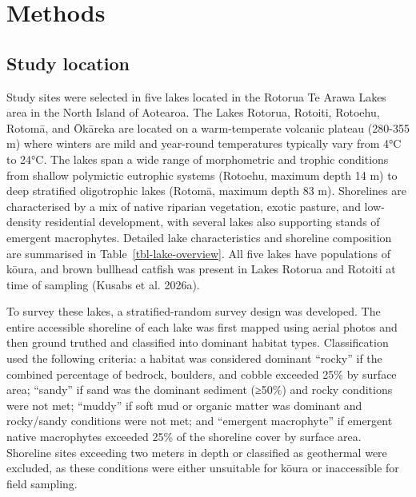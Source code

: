 \documentclass[
  12pt,
  a4paper,
  oneside]{scrbook}
\begin{document}
\section{Methods}\label{methods-1}

\subsection{Study location}\label{study-location}

Study sites were selected in five lakes located in the Rotorua Te Arawa
Lakes area in the North Island of Aotearoa. The Lakes Rotorua, Rotoiti,
Rotoehu, Rotomā, and Ōkāreka are located on a warm-temperate volcanic
plateau (280-355 m) where winters are mild and year-round temperatures
typically vary from 4°C to 24°C. The lakes span a wide range of
morphometric and trophic conditions from shallow polymictic eutrophic
systems (Rotoehu, maximum depth 14 m) to deep stratified oligotrophic
lakes (Rotomā, maximum depth 83 m). Shorelines are characterised by a
mix of native riparian vegetation, exotic pasture, and low-density
residential development, with several lakes also supporting stands of
emergent macrophytes. Detailed lake characteristics and shoreline
composition are summarised in Table~\ref{tbl-lake-overview}. All five
lakes have populations of kōura, and brown bullhead catfish was present
in Lakes Rotorua and Rotoiti at time of sampling (Kusabs et al. 2026a).

To survey these lakes, a stratified-random survey design was developed.
The entire accessible shoreline of each lake was first mapped using
aerial photos and then ground truthed and classified into dominant
habitat types. Classification used the following criteria: a habitat was
considered dominant ``rocky'' if the combined percentage of bedrock,
boulders, and cobble exceeded 25\% by surface area; ``sandy'' if sand
was the dominant sediment (≥50\%) and rocky conditions were not met;
``muddy'' if soft mud or organic matter was dominant and rocky/sandy
conditions were not met; and ``emergent macrophyte'' if emergent native
macrophytes exceeded 25\% of the shoreline cover by surface area.
Shoreline sites exceeding two meters in depth or classified as
geothermal were excluded, as these conditions were either unsuitable for
kōura or inaccessible for field sampling.
\end{document}
